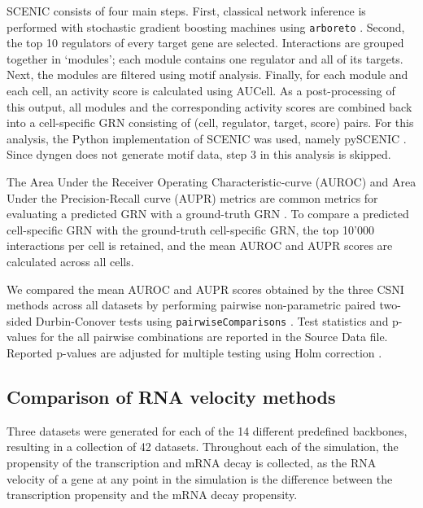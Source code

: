 \documentclass[
  table,
  10pt,
  a4paper]{article}
\begin{document}
SCENIC \autocite{aibar_scenicsinglecellregulatory_2017} consists of four
main steps. First, classical network inference is performed with
stochastic gradient boosting machines using \texttt{arboreto}
\autocite{moerman_grnboost2arboretoefficient_2019}. Second, the top 10
regulators of every target gene are selected. Interactions are grouped
together in `modules'; each module contains one regulator and all of its
targets. Next, the modules are filtered using motif analysis. Finally,
for each module and each cell, an activity score is calculated using
AUCell. As a post-processing of this output, all modules and the
corresponding activity scores are combined back into a cell-specific GRN
consisting of (cell, regulator, target, score) pairs. For this analysis,
the Python implementation of SCENIC was used, namely pySCENIC
\autocite{vandesande_scalablescenicworkflow_2020}. Since dyngen does not
generate motif data, step 3 in this analysis is skipped.

The Area Under the Receiver Operating Characteristic-curve (AUROC) and
Area Under the Precision-Recall curve (AUPR) metrics are common metrics
for evaluating a predicted GRN with a ground-truth GRN
\autocite{marbach_generatingrealisticsilico_2009}. To compare a
predicted cell-specific GRN with the ground-truth cell-specific GRN, the
top 10'000 interactions per cell is retained, and the mean AUROC and
AUPR scores are calculated across all cells.

We compared the mean AUROC and AUPR scores obtained by the three CSNI
methods across all datasets by performing pairwise non-parametric paired
two-sided Durbin-Conover tests
\autocite{conover_multiplecomparisonsprocedures_1979} using
\texttt{pairwiseComparisons}
\autocite{patil_pairwisecomparisonsmultiplepairwise_2019}. Test
statistics and p-values for the all pairwise combinations are reported
in the Source Data file. Reported p-values are adjusted for multiple
testing using Holm correction
\autocite{holm_simplesequentiallyrejective_1979}.

\hypertarget{sec:dyngen-velcompare}{%
\subsection{Comparison of RNA velocity
methods}\label{sec:dyngen-velcompare}}

Three datasets were generated for each of the 14 different predefined
backbones, resulting in a collection of 42 datasets. Throughout each of
the simulation, the propensity of the transcription and mRNA decay is
collected, as the RNA velocity of a gene at any point in the simulation
is the difference between the transcription propensity and the mRNA
decay propensity.
\end{document}

